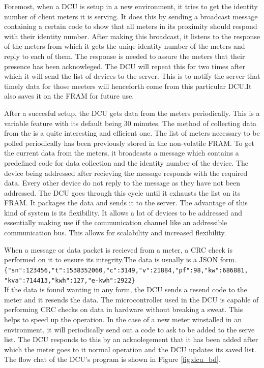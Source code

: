 Foremost, when a DCU is setup in a new environment, it tries to get the identity number of client meters it is serving. It does this by sending a broadcast message containing a certain code to show that all meters in its proximity should respond with their identity number. After making this broadcast, it listens to the response of the meters from which it gets the uniqe identity number of the meters and reply to each of them. The response is needed to assure the meters that their presence has been acknowleged. The DCU will repeat this for two times after which it will send the list of devices to the server. This is to notify the server that timely data for those meeters will henceforth come from this particular DCU.It also saves it on the FRAM for future use.

 
After a succesful setup, the DCU gets data from the meters periodically. This is a variable feature with its default being 30 minutes. The method of collecting data from the is a quite interesting and efficient one. The list of meters necessary to be polled periodically has been previously stored in the non-volatile FRAM. To get the current data from the meters, it broadcasts a message which contains a predefined code for data collection and the identity number of the device. The device being addressed after recieving the message responds with the required data. Every other device do not reply to the message as they have not been addressed.  The DCU goes through this cycle until it exhausts the list on its FRAM. It packages the data and sends it to the server. The advantage of this kind of system is its flexibility. It allows a lot of devices to be addressed and essentially making use if the communication channel like an addressible communication bus. This allows for scalability and increased flexibility.

When a message or data packet is recieved from a meter, a CRC check is performed on it to ensure its integrity.The data is usually is a JSON form.\\
 \verb|{"sn":123456,"t":1538352060,"c":3149,"v":21884,"pf":98,"kw":686881,|\\
 \verb|"kva":714413,"kwh":127,"e-kwh":2922}|\\
If the data is found wanting in any form, the DCU sends a resend code to the meter and it resends the data. The microcontroller used in the DCU is capable of performing CRC checks on data in hardware without breaking a sweat. This helps to speed up the operation. In the case of a new meter winstalled in an environment, it will periodically send out a code to ask to be added to the serve list. The DCU  responds to this by an acknolegement that it has been added after which the meter goes to it normal operation and the DCU updates its saved list. The flow chat of the DCU's program is shown in Figure \ref{fig:dcu_bd}.


